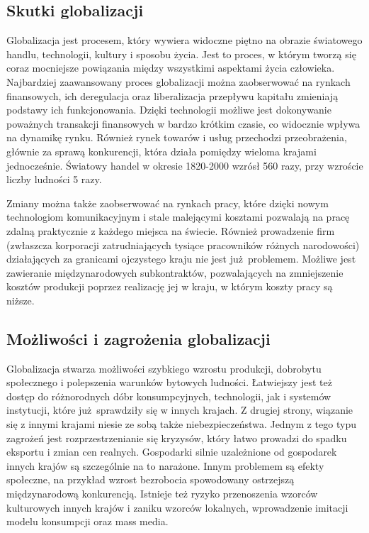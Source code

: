 \documentclass[12pt]{extarticle}
\begin{document}
\subsection{Skutki globalizacji}

Globalizacja jest procesem, który wywiera widoczne piętno na obrazie światowego handlu, technologii, kultury i sposobu życia. Jest to proces, w którym tworzą się coraz mocniejsze powiązania między wszystkimi aspektami życia człowieka. Najbardziej zaawansowany proces globalizacji można zaobserwować na rynkach finansowych, ich deregulacja oraz liberalizacja przepływu kapitału zmieniają podstawy ich funkcjonowania. Dzięki technologii możliwe jest dokonywanie poważnych transakcji finansowych w bardzo krótkim czasie, co widocznie wpływa na dynamikę rynku. Również rynek towarów i usług przechodzi przeobrażenia, głównie za sprawą konkurencji, która działa pomiędzy wieloma krajami jednocześnie. Światowy handel w okresie 1820-2000 wzrósł 560 razy, przy wzroście liczby ludności 5 razy.

Zmiany można także zaobserwować na rynkach pracy, które dzięki nowym technologiom komunikacyjnym i stale malejącymi kosztami pozwalają na pracę zdalną praktycznie z każdego miejsca na świecie. Również prowadzenie firm (zwłaszcza korporacji zatrudniających tysiące pracowników różnych narodowości) działających za granicami ojczystego kraju nie jest już problemem. Możliwe jest zawieranie międzynarodowych subkontraktów, pozwalających na zmniejszenie kosztów produkcji poprzez realizację jej w kraju, w którym koszty pracy są niższe.

\subsection{Możliwości i zagrożenia globalizacji}

Globalizacja stwarza możliwości szybkiego wzrostu produkcji, dobrobytu społecznego i polepszenia warunków bytowych ludności. Łatwiejszy jest też dostęp do różnorodnych dóbr konsumpcyjnych, technologii, jak i systemów instytucji, które już sprawdziły się w innych krajach. Z drugiej strony, wiązanie się z innymi krajami niesie ze sobą także niebezpieczeństwa. Jednym z tego typu zagrożeń jest rozprzestrzenianie się kryzysów, który łatwo prowadzi do spadku eksportu i zmian cen realnych. Gospodarki silnie uzależnione od gospodarek innych krajów są szczególnie na to narażone. Innym problemem są efekty społeczne, na przykład wzrost bezrobocia spowodowany ostrzejszą międzynarodową konkurencją. Istnieje też ryzyko przenoszenia wzorców kulturowych innych krajów i zaniku wzorców lokalnych, wprowadzenie imitacji modelu konsumpcji oraz mass media.
\end{document}
